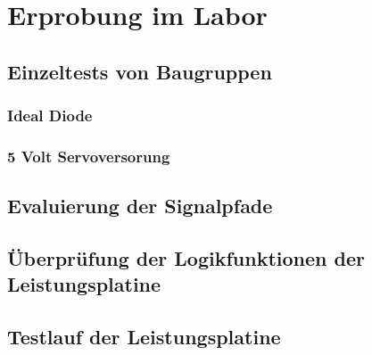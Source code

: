 \chapter{Erprobung im Labor}\label{cha:Erprobung im Labor}

\section{Einzeltests von Baugruppen}

\subsection{Ideal Diode}

\subsection{5 Volt Servoversorung}

\section{Evaluierung der Signalpfade}

\section{Überprüfung der Logikfunktionen der Leistungsplatine}

\section{Testlauf der Leistungsplatine}